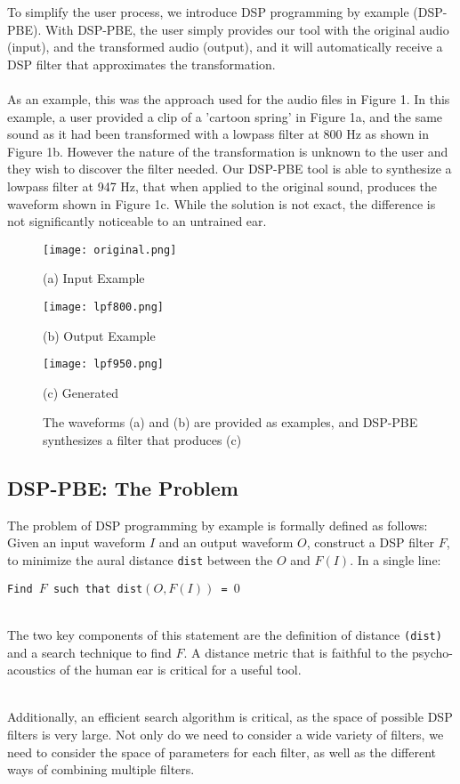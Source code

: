 \documentclass[english, 11pt]{article}
\begin{document}
To simplify the user process, we introduce DSP programming by example (DSP-PBE). With DSP-PBE, the user simply provides our tool with the original audio (input), and the transformed audio (output), and it will automatically receive a DSP filter that approximates the transformation. \\ \\
As an example, this was the approach used for the audio files in Figure 1. In this example, a user provided a clip of a 'cartoon spring' in Figure 1a, and the same sound as it had been transformed with a lowpass filter at 800 Hz as shown in Figure 1b. However the nature of the transformation is unknown to the user and they wish to discover the filter needed. Our DSP-PBE tool is able to synthesize a lowpass filter at 947 Hz, that when applied to the original sound, produces the waveform shown in Figure 1c. While the solution is not exact, the difference is not significantly noticeable to an untrained ear.
\begin{figure}[!htb]
  \texttt{[image: original.png]}
  \caption*{(a) Input Example}\label{fig:image1}
\endminipage\hfill
{}
  \texttt{[image: lpf800.png]}
  \caption*{(b) Output Example}\label{fig:image2}
\endminipage\hfill
{}%
  \texttt{[image: lpf950.png]}
  \caption*{(c) Generated}\label{fig:image3}
\endminipage
\caption{The waveforms (a) and (b) are provided as examples, and DSP-PBE synthesizes a filter that produces (c)}
\end{figure}
\subsection{DSP-PBE: The Problem}
The problem of DSP programming by example is formally defined as follows: Given an input waveform \texttt{$I$} and an output waveform \texttt{$O$}, construct a DSP filter \texttt{$F$}, to minimize the aural distance \texttt{dist} between the \texttt{$O$} and \texttt{$F(I)$}. In a single line: \\

\centerline{ \texttt{Find $F$ such that dist$(O, F(I))$ = $0$}} ~\\
The two key components of this statement are the definition of distance \texttt{(dist)} and a search technique to find \texttt{$F$}. A distance metric that is faithful to the psycho-acoustics of the human ear is critical for a useful tool.  \\ \\
\begin{comment} 
As an example, taking a trivial distance function that returns the difference in length of the two audio samples will allow a delay filter to satisfy any example pair of samples.
\end{comment}
Additionally, an efficient search algorithm is critical, as the space of possible DSP filters is very large. Not only do we need to consider a wide variety of filters, we need to consider the space of parameters for each filter, as well as the different ways of combining multiple filters.
\end{document}
